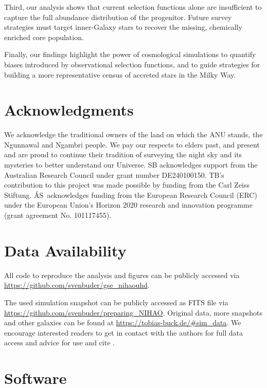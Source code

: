 \documentclass[fleqn,usenatbib]{mnras}
\begin{document}
Third, our analysis shows that current selection functions alone are insufficient to capture the full abundance distribution of the progenitor. Future survey strategies must target inner-Galaxy stars to recover the missing, chemically enriched core population.

Finally, our findings highlight the power of cosmological simulations to quantify biases introduced by observational selection functions, and to guide strategies for building a more representative census of accreted stars in the Milky Way.

\section*{Acknowledgments}

We acknowledge the traditional owners of the land on which the ANU stands, the Ngunnawal and Ngambri people. We pay our respects to elders past, and present and are proud to continue their tradition of surveying the night sky and its mysteries to better understand our Universe. SB acknowledges support from the Australian Research Council under grant number DE240100150.
TB's contribution to this project was made possible by funding from the Carl Zeiss Stiftung. \'{A}S~acknowledges funding from the European Research Council (ERC) under the European Union’s Horizon 2020 research and innovation programme (grant agreement No. 101117455).

\section*{Data Availability}

All code to reproduce the analysis and figures can be publicly accessed via \url{https://github.com/svenbuder/gse_nihaouhd}.

The used simulation snapshot can be publicly accessed as FITS file via \url{https://github.com/svenbuder/preparing_NIHAO}. Original data, more snapshots and other galaxies can be found at \url{https://tobias-buck.de/#sim_data}. We encourage interested readers to get in contact with the authors for full data access and advice for use and cite \citet{Buck2020b, Buck2021}.

\section*{Software}
\end{document}
